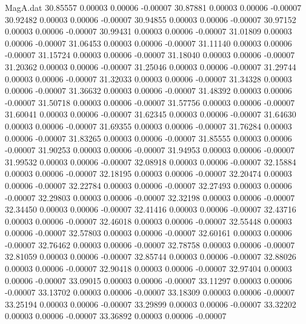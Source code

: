 \begin{filecontents}{MagA.dat}
  30.85557    0.00003    0.00006   -0.00007
  30.87881    0.00003    0.00006   -0.00007
  30.92482    0.00003    0.00006   -0.00007
  30.94855    0.00003    0.00006   -0.00007
  30.97152    0.00003    0.00006   -0.00007
  30.99431    0.00003    0.00006   -0.00007
  31.01809    0.00003    0.00006   -0.00007
  31.06453    0.00003    0.00006   -0.00007
  31.11140    0.00003    0.00006   -0.00007
  31.15724    0.00003    0.00006   -0.00007
  31.18040    0.00003    0.00006   -0.00007
  31.20362    0.00003    0.00006   -0.00007
  31.25046    0.00003    0.00006   -0.00007
  31.29744    0.00003    0.00006   -0.00007
  31.32033    0.00003    0.00006   -0.00007
  31.34328    0.00003    0.00006   -0.00007
  31.36632    0.00003    0.00006   -0.00007
  31.48392    0.00003    0.00006   -0.00007
  31.50718    0.00003    0.00006   -0.00007
  31.57756    0.00003    0.00006   -0.00007
  31.60041    0.00003    0.00006   -0.00007
  31.62345    0.00003    0.00006   -0.00007
  31.64630    0.00003    0.00006   -0.00007
  31.69355    0.00003    0.00006   -0.00007
  31.76284    0.00003    0.00006   -0.00007
  31.83265    0.00003    0.00006   -0.00007
  31.85555    0.00003    0.00006   -0.00007
  31.90253    0.00003    0.00006   -0.00007
  31.94953    0.00003    0.00006   -0.00007
  31.99532    0.00003    0.00006   -0.00007
  32.08918    0.00003    0.00006   -0.00007
  32.15884    0.00003    0.00006   -0.00007
  32.18195    0.00003    0.00006   -0.00007
  32.20474    0.00003    0.00006   -0.00007
  32.22784    0.00003    0.00006   -0.00007
  32.27493    0.00003    0.00006   -0.00007
  32.29803    0.00003    0.00006   -0.00007
  32.32198    0.00003    0.00006   -0.00007
  32.34450    0.00003    0.00006   -0.00007
  32.41416    0.00003    0.00006   -0.00007
  32.43716    0.00003    0.00006   -0.00007
  32.46018    0.00003    0.00006   -0.00007
  32.55448    0.00003    0.00006   -0.00007
  32.57803    0.00003    0.00006   -0.00007
  32.60161    0.00003    0.00006   -0.00007
  32.76462    0.00003    0.00006   -0.00007
  32.78758    0.00003    0.00006   -0.00007
  32.81059    0.00003    0.00006   -0.00007
  32.85744    0.00003    0.00006   -0.00007
  32.88026    0.00003    0.00006   -0.00007
  32.90418    0.00003    0.00006   -0.00007
  32.97404    0.00003    0.00006   -0.00007
  33.09015    0.00003    0.00006   -0.00007
  33.11297    0.00003    0.00006   -0.00007
  33.13702    0.00003    0.00006   -0.00007
  33.18309    0.00003    0.00006   -0.00007
  33.25194    0.00003    0.00006   -0.00007
  33.29899    0.00003    0.00006   -0.00007
  33.32202    0.00003    0.00006   -0.00007
  33.36892    0.00003    0.00006   -0.00007

\end{filecontents}
